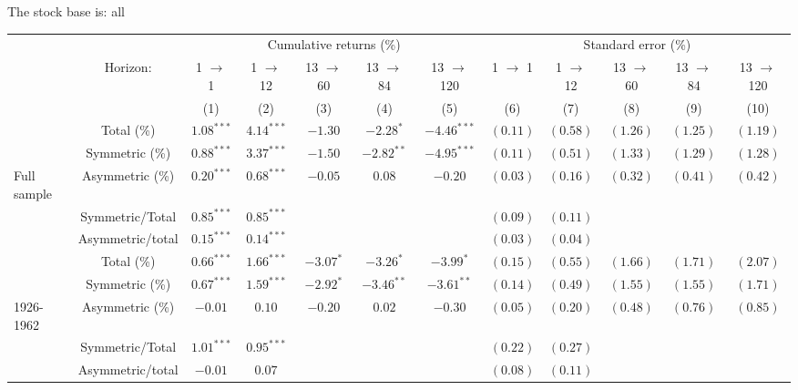 \documentclass[
]{article}
\author{}
\date{\vspace{-2.5em}}
\begin{document}
The stock base is: all

\begin{tabular}{lccccccccccc}
   \toprule & & \multicolumn{5}{c}{Cumulative returns (\%)} & \multicolumn{5}{c}{Standard error (\%)} \\
 \cmidrule(l){2-7} \cmidrule(l){8-12} & Horizon: & 1 $\rightarrow$ 1 & 1 $\rightarrow$ 12 & 13 $\rightarrow$ 60 & 13 $\rightarrow$ 84 & 13 $\rightarrow$ 120 & 1 $\rightarrow$ 1 & 1 $\rightarrow$ 12 & 13 $\rightarrow$ 60 & 13 $\rightarrow$ 84 & 13 $\rightarrow$ 120 \\ 
   \cmidrule(l){3-7} \cmidrule(l){8-12} \vspace{5pt} &  & (1) & (2) & (3) & (4) & (5) & (6) & (7) & (8) & (9) & (10) \\ 
   & Total (\%) & $1.08^{***}$ & $4.14^{***}$ & $-1.30$ & $-2.28^{*}$ & $-4.46^{***}$ & $(0.11)$ & $(0.58)$ & $(1.26)$ & $(1.25)$ & $(1.19)$ \\ 
   & Symmetric (\%) & $0.88^{***}$ & $3.37^{***}$ & $-1.50$ & $-2.82^{**}$ & $-4.95^{***}$ & $(0.11)$ & $(0.51)$ & $(1.33)$ & $(1.29)$ & $(1.28)$ \\ 
   \vspace{5pt}Full sample & Asymmetric (\%) & $0.20^{***}$ & $0.68^{***}$ & $-0.05$ & $0.08$ & $-0.20$ & $(0.03)$ & $(0.16)$ & $(0.32)$ & $(0.41)$ & $(0.42)$ \\ 
   & Symmetric/Total & $0.85^{***}$ & $0.85^{***}$ &  &  &  & $(0.09)$ & $(0.11)$ &  &  &  \\ 
   \vspace{5pt} & Asymmetric/total & $0.15^{***}$ & $0.14^{***}$ &  &  &  & $(0.03)$ & $(0.04)$ &  &  &  \\ 
   \hline & Total (\%) & $0.66^{***}$ & $1.66^{***}$ & $-3.07^{*}$ & $-3.26^{*}$ & $-3.99^{*}$ & $(0.15)$ & $(0.55)$ & $(1.66)$ & $(1.71)$ & $(2.07)$ \\ 
   & Symmetric (\%) & $0.67^{***}$ & $1.59^{***}$ & $-2.92^{*}$ & $-3.46^{**}$ & $-3.61^{**}$ & $(0.14)$ & $(0.49)$ & $(1.55)$ & $(1.55)$ & $(1.71)$ \\ 
   \vspace{5pt}1926-1962 & Asymmetric (\%) & $-0.01$ & $0.10$ & $-0.20$ & $0.02$ & $-0.30$ & $(0.05)$ & $(0.20)$ & $(0.48)$ & $(0.76)$ & $(0.85)$ \\ 
   & Symmetric/Total & $1.01^{***}$ & $0.95^{***}$ &  &  &  & $(0.22)$ & $(0.27)$ &  &  &  \\ 
   \vspace{5pt} & Asymmetric/total & $-0.01$ & $0.07$ &  &  &  & $(0.08)$ & $(0.11)$ &  &  &  \\ 

\end{tabular}
\end{document}

